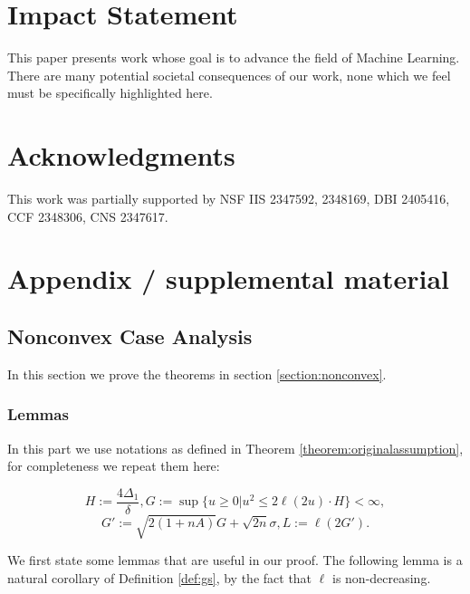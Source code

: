 \documentclass{article} %
\theoremstyle{plain}
\theoremstyle{definition}
\theoremstyle{remark}
\begin{document}

\section*{Impact Statement}

This paper presents work whose goal is to advance the field
of Machine Learning. There are many potential societal
consequences of our work, none which we feel must be
specifically highlighted here.

\section*{Acknowledgments}
This work was partially supported by NSF IIS 2347592, 2348169, DBI 2405416, CCF 2348306, CNS 2347617.





\newpage
\onecolumn
\appendix

\section{Appendix / supplemental material}

\subsection{Nonconvex Case Analysis}

In this section we prove the theorems in section \ref{section:nonconvex}.

\subsubsection{Lemmas}
\label{appendix:lemmas}

In this part we use notations as defined in Theorem \ref{theorem:originalassumption}, for completeness we repeat them here:

$$H:=\frac{4\Delta_1}{\delta}, G:=\sup\{u\geq 0|u^2\leq 2\ell(2u)\cdot H\}<\infty,$$ $$G':=\sqrt{2(1+nA)}G+\sqrt{2n}\sigma, L:=\ell(2G').$$

We first state some lemmas that are useful in our proof. The following lemma is a natural corollary of Definition \ref{def:gs}, by the fact that $\ell$ is non-decreasing.

\end{document}
